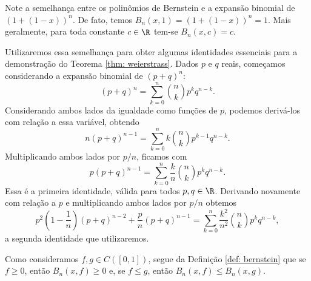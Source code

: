 Note a semelhança entre os polinômios de Bernstein e a expansão binomial de \( ( 1 + ( 1 - x ) )^{ n } \).
De fato, temos \( B_{ n } (x, 1) = ( 1 + ( 1 - x ) )^{ n } = 1 \).
Mais geralmente, para toda constante \( c \in \R \) tem-se \( B_{ n } (x, c) = c \).

Utilizaremos essa semelhança para obter algumas identidades essenciais para a demonstração do Teorema \ref{thm: weierstrass}.
Dados \( p \) e \( q \) reais, começamos considerando a expansão binomial de \( ( p + q )^{ n } \):\[
    ( p + q )^{ n } =
    \sum_{ k=0 }^{ n } \binom{n}{k} p^{ k } q^{ n-k }
.\]
Considerando ambos lados da igualdade como funções de \( p \), podemos derivá-los com relação a essa variável, obtendo \[
    n ( p + q )^{ n-1 } =
    \sum_{ k=0 }^{ n } k \binom{n}{k} p^{ k-1 } q^{ n-k }
.\]
Multiplicando ambos lados por \( p/n \), ficamos com
    \begin{equation}
        p ( p + q )^{ n-1 } =
        \sum_{ k=0 }^{ n } \frac{ k }{ n } \binom{n}{k} p^{ k } q^{ n-k }
        \label{eq: id_1}
    .\end{equation}
Essa é a primeira identidade, válida para todos \( p, q \in \R \).
Derivando novamente com relação a \( p \) e multiplicando ambos lados por \( p/n \) obtemos
\begin{equation}
    p^2 \left( 1 - \frac{ 1 }{ n } \right) ( p + q )^{ n-2 } + \frac{ p }{ n } ( p + q )^{ n-1 } =
    \sum_{ k=0 }^{ n } \frac{ k^2 }{ n^2 } \binom{n}{k} p^{ k } q^{ n-k }
    \label{eq: id_2}
,\end{equation}
a segunda identidade que utilizaremos.


Como consideramos \( f, g \in C([0, 1]) \), segue da Definição \ref{def: bernstein} que se \( f \geq 0 \), então \( B_{ n } (x, f) \geq 0 \) e, se \( f \leq g \), então \( B_{ n } (x, f) \leq B_{ n } (x, g) \).

